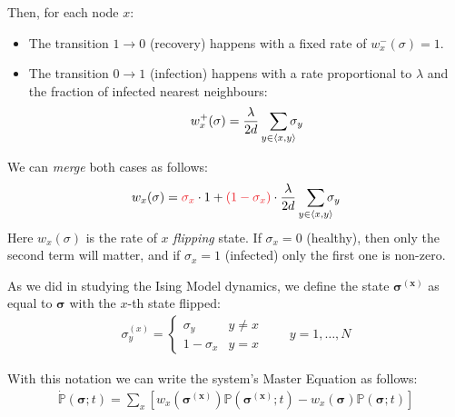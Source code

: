 \documentclass[../../main.tex]{subfiles}
\begin{document}
Then, for each node $x$:
\begin{itemize}
    \item The transition $1 \to 0$ (recovery) happens with a fixed rate of $w_{x}^-(\sigma) = 1$.
    \item The transition $0 \to 1$ (infection) happens with a rate proportional to $\lambda$ and the fraction of infected nearest neighbours:
    \begin{align*}
        w_{x}^+(\sigma) = \frac{\lambda}{2d} \> \> \> \sum_{\mathclap{y \in \langle x,y \rangle}} \sigma_y
    \end{align*} 
\end{itemize}
We can \textit{merge} both cases as follows:
\begin{align}\label{eqn:contact-transition-rate}
    w_x(\sigma) = \textcolor{Red}{\sigma_x} \cdot 1 + \textcolor{Red}{(1-\sigma_x)} \cdot \frac{\lambda}{2d} \>\>\> \sum_{\mathclap{y \in \langle x,y \rangle}}  \sigma_y
\end{align} 
Here $w_x(\sigma)$ is the rate of $x$ \textit{flipping} state. If $\sigma_x = 0$ (healthy), then only the second term will matter, and if $\sigma_x = 1$ (infected) only the first one is non-zero.

\medskip

As we did in studying the Ising Model dynamics, we define the state $\bm{\sigma^{(x)}}$ as equal to $\bm{\sigma}$ with the $x$-th state flipped:
\begin{align*}
    \sigma_y^{(x)} = \begin{cases}
        \sigma_y & y \neq x\\
        1 - \sigma_x & y = x
    \end{cases} \qquad y = 1,\dots,N
\end{align*}

With this notation we can write the system's Master Equation as follows:
\begin{align}\label{eqn:contact-ME2}
    \dot{\mathbb{P}}(\bm{\sigma}; t) = \sum_{x} [w_x (\bm{\sigma^{(x)}}) \mathbb{P}(\bm{\sigma^{(x)}}; t) - w_x(\bm{\sigma}) \mathbb{P}(\bm{\sigma}; t)]
\end{align}
\end{document}
